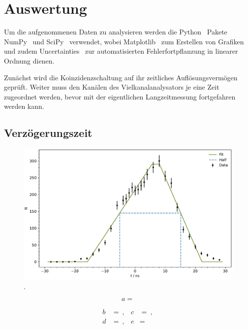 \newpage
\section{Auswertung}

Um die aufgenommenen Daten zu analysieren werden die Python~\cite{python} Pakete NumPy~\cite{numpy} und SciPy~\cite{scipy} verwendet,
wobei Matplotlib~\cite{matplotlib} zum Erstellen von Grafiken und zudem Uncertainties~\cite{uncertainties} zur automatisierten
Fehlerfortpflanzung in linearer Ordnung dienen.

Zunächst wird die Koinzidenzschaltung auf ihr zeitliches Auflösungsvermögen geprüft. Weiter muss den Kanälen des Vielkanalanalysators
je eine Zeit zugeordnet werden, bevor mit der eigentlichen Langzeitmessung fortgefahren werden kann.



\subsection{Verzögerungszeit}

\begin{figure}[H]
	\centering
	\includegraphics[width=\textwidth]{build/delay.pdf}
	\caption{.}
	\label{fig:delay}
\end{figure}

\begin{equation*}
	a = 
\end{equation*}

\begin{align*}
	b &=  \: , & c &=  \: , \\
	d &=  \: , & e &= 
\end{align*}

